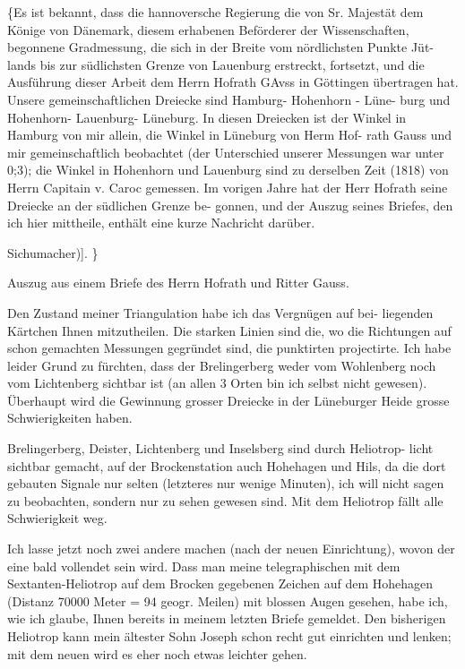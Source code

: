 \documentclass[12pt,a4paper]{article}
\theoremstyle{plain}
\theoremstyle{definition}
\theoremstyle{remark}
\begin{document}
\noindent
\{Es ist bekannt, dass die hannoversche Regierung die von Sr. Majestät
dem Könige von Dänemark, diesem erhabenen Beförderer der Wissenschaften,
begonnene Gradmessung, die sich in der Breite vom nördlichsten Punkte Jüt-
lands bis zur südlichsten Grenze von Lauenburg erstreckt, fortsetzt, und die
Ausführung dieser Arbeit dem Herrn Hofrath GAvss in Göttingen übertragen
hat. Unsere gemeinschaftlichen Dreiecke sind Hamburg- Hohenhorn - Lüne-
burg und Hohenhorn- Lauenburg- Lüneburg. In diesen Dreiecken ist der
Winkel in Hamburg von mir allein, die Winkel in Lüneburg von Herm Hof-
rath Gauss und mir gemeinschaftlich beobachtet (der Unterschied unserer
Messungen war unter 0;3); die Winkel in Hohenhorn und Lauenburg sind zu
derselben Zeit (1818) von Herrn Capitain v. Caroc gemessen. Im vorigen
Jahre hat der Herr Hofrath seine Dreiecke an der südlichen Grenze be-
gonnen, und der Auszug seines Briefes, den ich hier mittheile, enthält eine
kurze Nachricht darüber.

\noindent
Sichumacher)]. \}

\noindent
Auszug aus einem Briefe des Herrn Hofrath und Ritter Gauss.

\noindent
Den Zustand meiner Triangulation habe ich das Vergnügen auf bei-
liegenden Kärtchen Ihnen mitzutheilen. Die starken Linien sind die, wo die
Richtungen auf schon gemachten Messungen gegründet sind, die punktirten
projectirte. Ich habe leider Grund zu fürchten, dass der Brelingerberg weder
vom Wohlenberg noch vom Lichtenberg sichtbar ist (an allen 3 Orten bin
ich selbst nicht gewesen). Überhaupt wird die Gewinnung grosser Dreiecke
in der Lüneburger Heide grosse Schwierigkeiten haben.

\noindent

\noindent

\noindent
Brelingerberg, Deister, Lichtenberg und Inselsberg sind durch Heliotrop-
licht sichtbar gemacht, auf der Brockenstation auch Hohehagen und Hils, da
die dort gebauten Signale nur selten (letzteres nur wenige Minuten), ich will
nicht sagen zu beobachten, sondern nur zu sehen gewesen sind. Mit dem
Heliotrop fällt alle Schwierigkeit weg.

\noindent
Ich lasse jetzt noch zwei andere machen (nach der neuen Einrichtung),
wovon der eine bald vollendet sein wird. Dass man meine telegraphischen
mit dem Sextanten-Heliotrop auf dem Brocken gegebenen Zeichen auf dem
Hohehagen (Distanz 70000 Meter = 94 geogr. Meilen) mit blossen Augen
gesehen, habe ich, wie ich glaube, Ihnen bereits in meinem letzten Briefe
gemeldet. Den bisherigen Heliotrop kann mein ältester Sohn Joseph schon
recht gut einrichten und lenken; mit dem neuen wird es eher noch etwas
leichter gehen.
\end{document}
